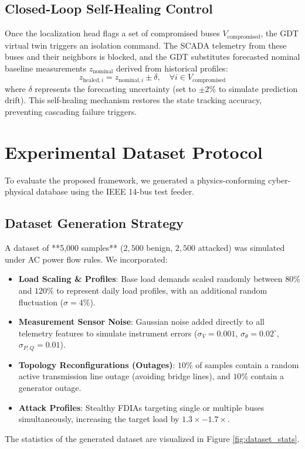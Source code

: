 \documentclass[12pt,a4paper]{report}
\begin{document}
\section{Closed-Loop Self-Healing Control}
Once the localization head flags a set of compromised buses $V_{\text{compromised}}$, the GDT virtual twin triggers an isolation command. The SCADA telemetry from these buses and their neighbors is blocked, and the GDT substitutes forecasted nominal baseline measurements $z_{\text{nominal}}$ derived from historical profiles:
\begin{equation}
z_{\text{healed}, i} = z_{\text{nominal}, i} \pm \delta, \quad \forall i \in V_{\text{compromised}}
\end{equation}
where $\delta$ represents the forecasting uncertainty (set to $\pm 2\%$ to simulate prediction drift). This self-healing mechanism restores the state tracking accuracy, preventing cascading failure triggers.

\chapter{Experimental Dataset Protocol}
To evaluate the proposed framework, we generated a physics-conforming cyber-physical database using the IEEE 14-bus test feeder. 

\section{Dataset Generation Strategy}
A dataset of **5,000 samples** ($2,500$ benign, $2,500$ attacked) was simulated under AC power flow rules. We incorporated:
\begin{itemize}
    \item \textbf{Load Scaling & Profiles}: Base load demands scaled randomly between $80\%$ and $120\%$ to represent daily load profiles, with an additional random fluctuation ($\sigma = 4\%$).
    \item \textbf{Measurement Sensor Noise}: Gaussian noise added directly to all telemetry features to simulate instrument errors ($\sigma_{V}=0.001$, $\sigma_{\theta}=0.02^\circ$, $\sigma_{P,Q}=0.01$).
    \item \textbf{Topology Reconfigurations (Outages)}: $10\%$ of samples contain a random active transmission line outage (avoiding bridge lines), and $10\%$ contain a generator outage.
    \item \textbf{Attack Profiles}: Stealthy FDIAs targeting single or multiple buses simultaneously, increasing the target load by $1.3\times - 1.7\times$.
\end{itemize}
The statistics of the generated dataset are visualized in Figure \ref{fig:dataset_stats}.
\end{document}
